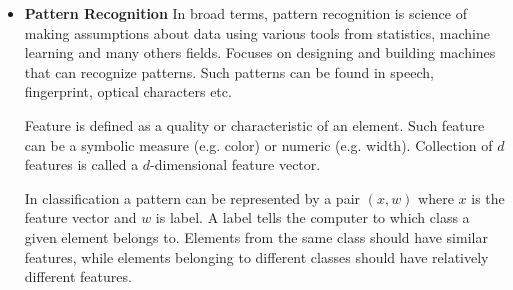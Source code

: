 \documentclass{article}
\begin{document}
\begin{itemize}

\item  {\bf Pattern Recognition}
In broad terms, pattern recognition is science of making assumptions about data using various tools from statistics, machine learning and many others fields.
Focuses on designing and building machines that can recognize patterns. Such patterns can be found in speech, fingerprint, optical characters etc.

Feature is defined as a quality or characteristic of an element.
Such feature can be a symbolic measure (e.g. color) or numeric (e.g. width).
Collection of $d$ features is called a $d$-dimensional feature vector.

In classification a pattern can be represented by a pair $(x,w)$ where $x$ is the feature vector and $w$ is label. A label tells the computer to which class a given element belongs to. Elements from the same class should have similar features, while elements belonging to different classes should have relatively different features.


\end{itemize}
\end{document}
